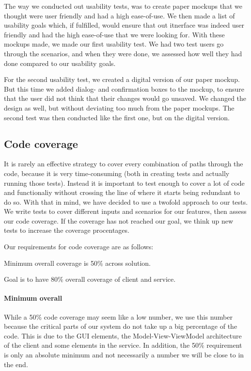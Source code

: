 The way we conducted out usability tests, was to create paper mockups that we thought were user friendly and had a high ease-of-use. We then made a list of usability goals which, if fulfilled, would ensure that out itnerface was indeed user friendly and had the high ease-of-use that we were looking for. With these mockups made, we made our first usability test. We had two test users go through the scenarios, and when they were done, we assessed how well they had done compared to our usability goals.

For the second usability test, we created a digital version of our paper mockup. But this time we added dialog- and confirmation boxes to the mockup, to ensure that the user did not think that their changes would go unsaved. We changed the design as well, but without deviating too much from the paper mockups. The second test was then conducted like the first one, but on the digital version.

\subsection{Code coverage}
\label{Testing_Strategy_Coverage}
It is rarely an effective strategy to cover every combination of paths through the code, because it is very time-consuming (both in creating tests and actually running those tests). Instead it is important to test enough to cover a lot of code and functionaliy without crossing the line of where it starts being redundant to do so\cite{WoT}. With that in mind, we have decided to use a twofold approach to our tests. We write tests to cover different inputs and scenarios for our features, then assess our code coverage. If the coverage has not reached our goal, we think up new tests to increase the coverage procentages.

Our requirements for code coverage are as follows:
\begin{my_itemize}
\item Minimum overall coverage is 50\% across solution.
\item Goal is to have 80\% overall coverage of client and service.
\end{my_itemize}

\paragraph{Minimum overall}
While a 50\% code coverage may seem like a low number, we use this number because the critical parts of our system do not take up a big percentage of the code. This is due to the GUI elements, the Model-View-ViewModel architecture of the client and some elements in the service. In addition, the 50\% requirement is only an absolute minimum and not necessarily a number we will be close to in the end.


